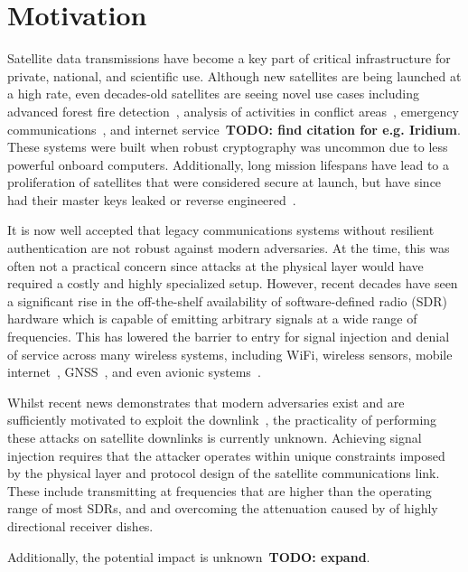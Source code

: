 \section{Motivation}

Satellite data transmissions have become a key part of critical infrastructure for private, national, and scientific use.
Although new satellites are being launched at a high rate, even decades-old satellites are seeing novel use cases including advanced forest fire detection~\cite{nasaFirms}, analysis of activities in conflict areas~\cite{separatistLuminosity}, emergency communications~\cite{apple_emergency_sos}, and internet service~\textbf{TODO: find citation for e.g. Iridium}.
These systems were built when robust cryptography was uncommon due to less powerful onboard computers.
Additionally, long mission lifespans have lead to a proliferation of satellites that were considered secure at launch, but have since had their master keys leaked or reverse engineered~\cite{lrit-key-dec,xrit-rx}.

It is now well accepted that legacy communications systems without resilient authentication are not robust against modern adversaries.
At the time, this was often not a practical concern since attacks at the physical layer would have required a costly and highly specialized setup.
However, recent decades have seen a significant rise in the off-the-shelf availability of software-defined radio (SDR) hardware which is capable of emitting arbitrary signals at a wide range of frequencies.
This has lowered the barrier to entry for signal injection and denial of service across many wireless systems, including WiFi, wireless sensors, mobile internet~\cite{yang2019hiding,erni2021adaptover}, GNSS~\cite{tippenhauer2011requirements}, and even avionic systems~\cite{sathayeWireless2019}.

Whilst recent news demonstrates that modern adversaries exist and are sufficiently motivated to exploit the downlink~\cite{satcomAnalysis}, the practicality of performing these attacks on satellite downlinks is currently unknown.
Achieving signal injection requires that the attacker operates within unique constraints imposed by the physical layer and protocol design of the satellite communications link.
These include transmitting at frequencies that are higher than the operating range of most SDRs, and and overcoming the attenuation caused by of highly directional receiver dishes.

Additionally, the potential impact is unknown~\textbf{TODO: expand}.

